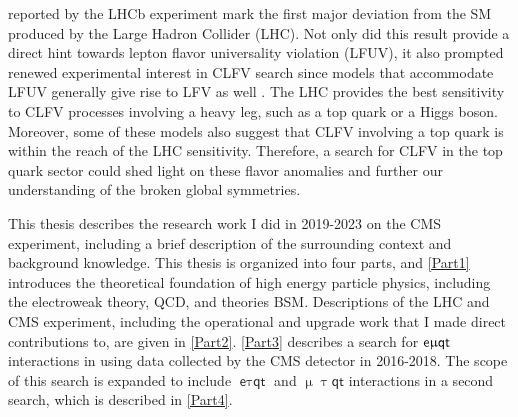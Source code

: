 reported by the LHCb experiment mark the first major deviation from the SM produced by the Large Hadron Collider (LHC). Not only did this result provide a direct hint towards lepton flavor universality violation (LFUV), it also prompted renewed experimental interest in CLFV search since models that accommodate LFUV generally give rise to LFV as well \cite{Glashow:2014iga}. The LHC provides the best sensitivity to CLFV processes involving a heavy leg, such as a top quark or a Higgs boson. Moreover, some of these models \cite{Kim:2018oih} also suggest that CLFV involving a top quark is within the reach of the LHC sensitivity. Therefore, a search for CLFV in the top quark sector could shed light on these flavor anomalies and further our understanding of the broken global symmetries.

This thesis describes the research work I did in 2019-2023 on the \ac{CMS} experiment, including a brief description of the surrounding context and background knowledge. This thesis is organized into four parts, and \autoref{Part1} introduces the theoretical foundation of high energy particle physics, including the electroweak theory, \ac{QCD}, and theories \ac{BSM}. Descriptions of the \ac{LHC} and {CMS} experiment, including the operational and upgrade work that I made direct contributions to, are given in \autoref{Part2}. \autoref{Part3} describes a search for $\textsf{e}\upmu\textsf{{q}t}$ interactions in using data collected by the \ac{CMS} detector in 2016-2018. The scope of this search is expanded to include $\textsf{e}\uptau\textsf{qt}$ and $\upmu\uptau\textsf{qt}$ interactions in a second search, which is described in \autoref{Part4}.




